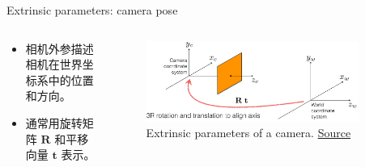 \documentclass[10pt,xcolor={table,dvipsnames},t]{beamer}
\begin{document}
\begin{frame}{Extrinsic parameters: camera pose}
  \begin{columns}
    \begin{column}{0.3\textwidth}
      \begin{itemize}
        \item 相机外参描述相机在世界坐标系中的位置和方向。
        \item 通常用旋转矩阵 $\mathbf{R}$ 和平移向量 $\mathbf{t}$ 表示。
      \end{itemize}
    \end{column}

    \begin{column}{0.7\textwidth}
      \begin{figure}
        \centering
        \includegraphics[width=0.9\textwidth]{figures/extrinsic-parameters.png}
        \caption{Extrinsic parameters of a camera. \href{https://www.cs.cmu.edu/~16385/s17/Slides/11.1\_Camera\_matrix.pdf}{Source}}
      \end{figure}
    \end{column}
  \end{columns}
  
\end{frame}
\end{document}
